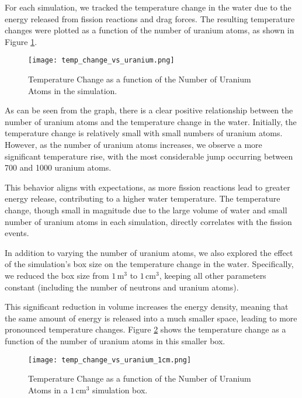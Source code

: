 \documentclass[twocolumn, 11pt]{article}
\begin{document}
For each simulation, we tracked the temperature change in the water due to the energy released from fission reactions and drag forces. The resulting temperature changes were plotted as a function of the number of uranium atoms, as shown in Figure \ref{fig:heat_release}.

\begin{figure}[h]
    \centering
    \texttt{[image: temp\_change\_vs\_uranium.png]}
    \caption{Temperature Change as a function of the Number of Uranium Atoms in the simulation.}
    \label{fig:heat_release}
\end{figure}

As can be seen from the graph, there is a clear positive relationship between the number of uranium atoms and the temperature change in the water. Initially, the temperature change is relatively small with small numbers of uranium atoms. However, as the number of uranium atoms increases, we observe a more significant temperature rise, with the most considerable jump occurring between 700 and 1000 uranium atoms.

This behavior aligns with expectations, as more fission reactions lead to greater energy release, contributing to a higher water temperature. The temperature change, though small in magnitude due to the large volume of water and small number of uranium atoms in each simulation, directly correlates with the fission events.

In addition to varying the number of uranium atoms, we also explored the effect of the simulation's box size on the temperature change in the water. Specifically, we reduced the box size from \(1 \, \text{m}^3\) to \(1 \, \text{cm}^3\), keeping all other parameters constant (including the number of neutrons and uranium atoms). 

This significant reduction in volume increases the energy density, meaning that the same amount of energy is released into a much smaller space, leading to more pronounced temperature changes. Figure \ref{fig:small_box_heat_release} shows the temperature change as a function of the number of uranium atoms in this smaller box.

\begin{figure}[h]
    \centering
    \texttt{[image: temp\_change\_vs\_uranium\_1cm.png]}
    \caption{Temperature Change as a function of the Number of Uranium Atoms in a \(1 \, \text{cm}^3\) simulation box.}
    \label{fig:small_box_heat_release}
\end{figure}
\end{document}
